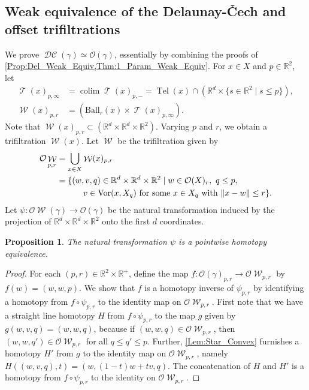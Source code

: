 \documentclass[11pt]{amsart}
\newcommand{\R}{\mathbb{R}} %
\newcommand{\Ball}{\text{Ball}}
\DeclareMathOperator{\Vor}{Vor}
\DeclareMathOperator{\Tel}{Tel}
\DeclareMathOperator{\TelVor}{\mathcal{T}}
\DeclareMathOperator{\TelDC}{\mathcal W}
\DeclareMathOperator{\DelCech}{\mathcal{DC}}
\DeclareMathOperator{\colim}{colim}
\newcommand{\Offset}[0]{\mathcal{O}}
\theoremstyle{plain}
\newtheorem{proposition}[theorem]{Proposition}
\theoremstyle{definition}
\theoremstyle{remark}
\begin{document}
\subsection{Weak equivalence of the Delaunay-\v Cech and offset trifiltrations}\label{def:teldelcech}
%
We prove $\DelCech(\gamma)\simeq \Offset(\gamma)$, essentially by combining the proofs of \cref{Prop:Del_Weak_Equiv,Thm:1_Param_Weak_Equiv}.   For $x\in X$ and $p\in \R^2$, let 
\begin{align*}
\TelVor(x)_{p,\infty}&=\colim \TelVor(x)_{p,-}=\Tel(x)\cap (\R^d\times \{s\in \R^2\mid s\leq p\}),\\
\TelDC(x)_{p,r}& =  (\Ball_r(x)\times \TelVor(x)_{p,\infty}).
\end{align*} 
 Note that $\TelDC(x)_{p,r}\subset (\R^d\times \R^d\times \R^2)$.  Varying $p$ and $r$, we obtain a trifiltration $\TelDC(x)$.  Let $\TelDC$ be the trifiltration given by 
\begin{align*}
\mathcal O\TelDC_{p,r}&=\bigcup_{x\in X} \TelDC(x)_{p,r}\\
                          &=\{(w,v,q)\in \R^d\times \R^d\times \R^2 \mid w\in \Offset(X)_r,\ q\leq p,\\
                          &\, \quad \qquad v\in \Vor(x,X_q)\textup{ for some }x\in X_q \textup{ with }\|x-w\|\leq r\}.
                      \end{align*}
%
Let $\psi\colon \mathcal O\TelDC(\gamma)\to \Offset(\gamma)$ be the natural transformation induced by the projection of $\R^d\times \R^d\times \R^2$ onto the first $d$ coordinates.
\begin{proposition}\label{prop:TelVOequiv} The natural transformation $\psi$ is a pointwise homotopy equivalence.  
\end{proposition}
%
\begin{proof}
For each $(p,r)\in \R^2\times \R^+$, define the map $f\colon \Offset(\gamma)_{p,r}\to \mathcal O\TelDC_{p,r}$ by $f(w)=(w,w,p)$.  We show that $f$ is a homotopy inverse of $\psi_{p,r}$ by identifying a homotopy from $f\circ \psi_{p,r}$ to the identity map on $\mathcal O\TelDC_{p,r}$.  First note that we have a straight line homotopy $H$ from $f\circ \psi_{p,r}$ to the map $g$ given by $g(w,v,q)=(w,w,q)$, because if $(w,w,q)\in \mathcal O\TelDC_{p,r}$, then $(w,w,q')\in \mathcal O\TelDC_{p,r}$ for all $q\leq q'\leq p$.  Further,  \cref{Lem:Star_Convex} furnishes a homotopy $H'$ from $g$ to the identity map on $\mathcal O\TelDC_{p,r}$, namely $H((w,v,q),t)=(w,(1-t)w+tv,q)$.   The concatenation of $H$ and $H'$ is a homotopy from $f\circ \psi_{p,r}$ to the identity on $\mathcal O\TelDC_{p,r}$.
\end{proof}
\end{document}
